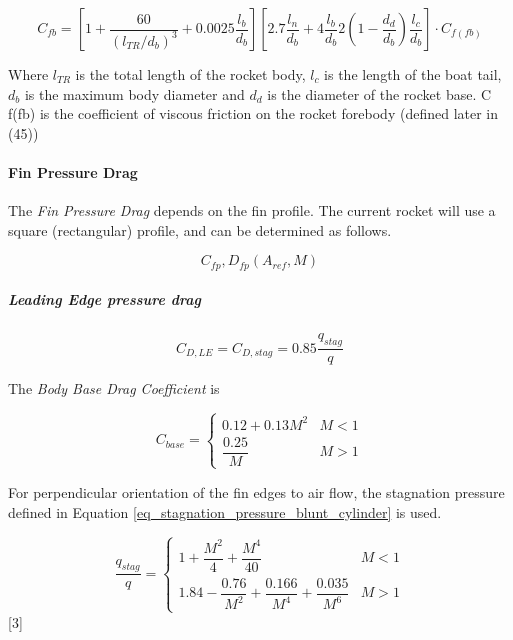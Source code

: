 \documentclass[]{article}
\let\oldparagraph\paragraph
\renewcommand{\paragraph}[1]{\oldparagraph{#1}\mbox{}}
\let\oldsubparagraph\subparagraph
\renewcommand{\subparagraph}[1]{\oldsubparagraph{#1}\mbox{}}
\begin{document}
\begin{equation}
\label{body_drag_coefficient}
C_{fb} = \left[ 1 + \dfrac{60}{(l_{TR}/d_b)^3} + 0.0025 \dfrac{l_b}{d_b} \right] \left[ 2.7 \dfrac{l_n}{d_b} + 4 \dfrac{l_b}{d_b} 2 \left( 1 - \dfrac{d_d}{d_b} \right) \dfrac{l_c}{d_b} \right] \cdot C_{f(fb)}
\end{equation}

Where \(l_{TR}\) is the total length of the rocket body, \(l_c\) is the
length of the boat tail, \(d_b\) is the maximum body diameter and
\(d_d\) is the diameter of the rocket base. C f(fb) is the coefficient
of viscous friction on the rocket forebody (defined later in (45))

\paragraph{Fin Pressure Drag}\label{fin-pressure-drag}

The \emph{Fin Pressure Drag} depends on the fin profile. The current
rocket will use a square (rectangular) profile, and can be determined as
follows.

\begin{equation}
C_{fp}, D_{fp} (A_{ref}, M) 
\end{equation}

\subparagraph{Leading Edge pressure
drag}\label{leading-edge-pressure-drag}

\begin{equation}
    C_{D,LE} = C_{D,stag} = 0.85 \dfrac{q_{stag}}{q}
\end{equation}

The \emph{Body Base Drag Coefficient} is

\begin{equation}
C_{base} =
\begin{cases}
    0.12 + 0.13 M^2     &   M < 1 \\
    \dfrac{0.25}{M}     &   M > 1
\end{cases}
\end{equation}

For perpendicular orientation of the fin edges to air flow, the
stagnation pressure defined in Equation
\ref{eq_stagnation_pressure_blunt_cylinder} is used.

\[
\dfrac{q_{stag}}{q} =  
\begin{cases}
    1 + \dfrac{M^2}{4} + \dfrac{M^4}{40}                                    & M < 1 \\
    1.84 - \dfrac{0.76}{M^2} + \dfrac{0.166}{M^4} + \dfrac{0.035}{M^6}      & M > 1
\end{cases}
\] {[}3{]}
\end{document}
